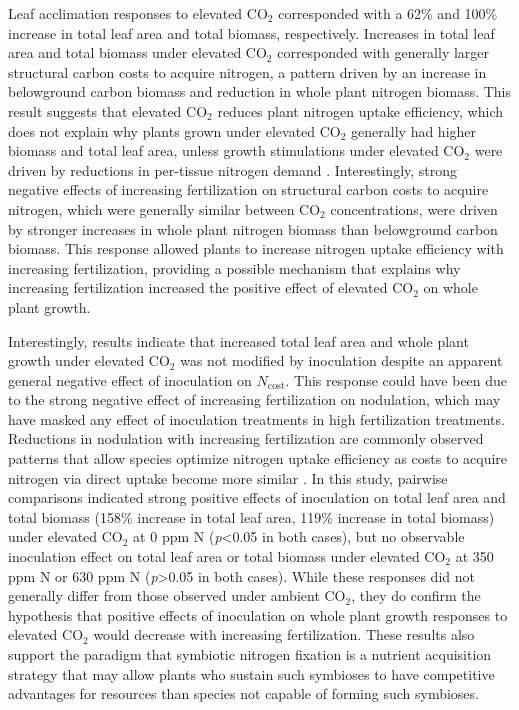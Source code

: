 Leaf acclimation responses to elevated CO$_2$ corresponded with a 62\% and 100\% increase in total leaf area and total biomass, respectively. Increases in total leaf area and total biomass under elevated CO$_2$ corresponded with generally larger structural carbon costs to acquire nitrogen, a pattern driven by an increase in belowground carbon biomass and reduction in whole plant nitrogen biomass. This result suggests that elevated CO$_2$ reduces plant nitrogen uptake efficiency, which does not explain why plants grown under elevated CO$_2$ generally had higher biomass and total leaf area, unless growth stimulations under elevated CO$_2$ were driven by reductions in per-tissue nitrogen demand . Interestingly, strong negative effects of increasing fertilization on structural carbon costs to acquire nitrogen, which were generally similar between CO$_2$ concentrations, were driven by stronger increases in whole plant nitrogen biomass than belowground carbon biomass. This response allowed plants to increase nitrogen uptake efficiency with increasing fertilization, providing a possible mechanism that explains why increasing fertilization increased the positive effect of elevated CO$_2$ on whole plant growth.

Interestingly, results indicate that increased total leaf area and whole plant growth under elevated CO$_2$ was not modified by inoculation despite an apparent general negative effect of inoculation on $N_\mathrm{cost}$. This response could have been due to the strong negative effect of increasing fertilization on nodulation, which may have masked any effect of inoculation treatments in high fertilization treatments. Reductions in nodulation with increasing fertilization are commonly observed patterns that allow species optimize nitrogen uptake efficiency as costs to acquire nitrogen via direct uptake become more similar . In this study, pairwise comparisons indicated strong positive effects of inoculation on total leaf area and total biomass (158\% increase in total leaf area, 119\% increase in total biomass) under elevated CO$_2$ at 0 ppm N (\textit{p}<0.05 in both cases), but no observable inoculation effect on total leaf area or total biomass under elevated CO$_2$ at 350 ppm N or 630 ppm N (\textit{p}>0.05 in both cases). While these responses did not generally differ from those observed under ambient CO$_2$, they do confirm the hypothesis that positive effects of inoculation on whole plant growth responses to elevated CO$_2$ would decrease with increasing fertilization. These results also support the paradigm that symbiotic nitrogen fixation is a nutrient acquisition strategy that may allow plants who sustain such symbioses to have competitive advantages for resources than species not capable of forming such symbioses.

